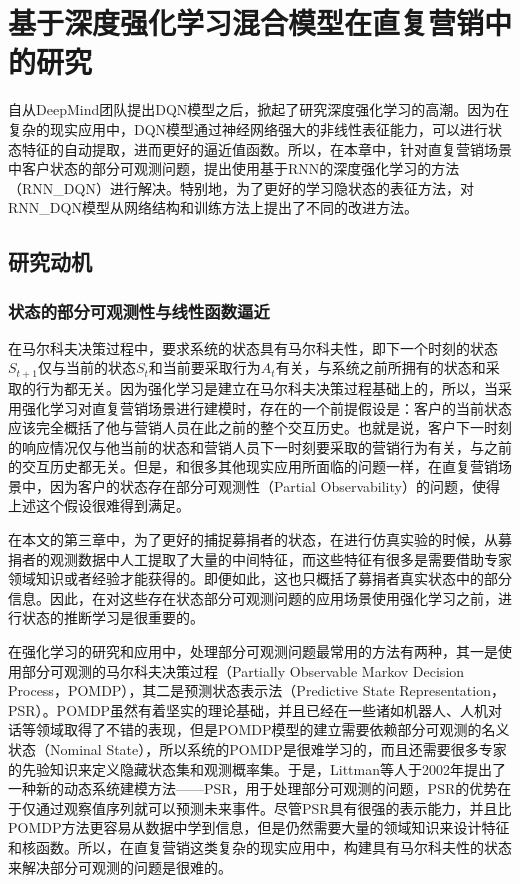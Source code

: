\chapter{基于深度强化学习混合模型在直复营销中的研究}
自从DeepMind团队提出DQN模型之后，掀起了研究深度强化学习的高潮。因为在复杂的现实应用中，DQN模型通过神经网络强大的非线性表征能力，可以进行状态特征的自动提取，进而更好的逼近值函数。所以，在本章中，针对直复营销场景中客户状态的部分可观测问题，提出使用基于RNN的深度强化学习的方法（RNN_DQN）进行解决。特别地，为了更好的学习隐状态的表征方法，对RNN_DQN模型从网络结构和训练方法上提出了不同的改进方法。

\section{研究动机}
\subsection{状态的部分可观测性与线性函数逼近}
在马尔科夫决策过程中，要求系统的状态具有马尔科夫性，即下一个时刻的状态$S_{t+1}$仅与当前的状态$S_{t}$和当前要采取行为$A_{t}$有关，与系统之前所拥有的状态和采取的行为都无关。因为强化学习是建立在马尔科夫决策过程基础上的，所以，当采用强化学习对直复营销场景进行建模时，存在的一个前提假设是：客户的当前状态应该完全概括了他与营销人员在此之前的整个交互历史。也就是说，客户下一时刻的响应情况仅与他当前的状态和营销人员下一时刻要采取的营销行为有关，与之前的交互历史都无关。但是，和很多其他现实应用所面临的问题一样，在直复营销场景中，因为客户的状态存在部分可观测性（Partial Observability）的问题，使得上述这个假设很难得到满足。

在本文的第三章中，为了更好的捕捉募捐者的状态，在进行仿真实验的时候，从募捐者的观测数据中人工提取了大量的中间特征，而这些特征有很多是需要借助专家领域知识或者经验才能获得的。即便如此，这也只概括了募捐者真实状态中的部分信息。因此，在对这些存在状态部分可观测问题的应用场景使用强化学习之前，进行状态的推断学习是很重要的。

在强化学习的研究和应用中，处理部分可观测问题最常用的方法有两种，其一是使用部分可观测的马尔科夫决策过程（Partially Observable Markov  Decision Process，POMDP）\citep{kaelbling1998planning}，其二是预测状态表示法（Predictive State Representation，PSR）\citep{littman2002predictive}。POMDP虽然有着坚实的理论基础，并且已经在一些诸如机器人、人机对话等领域取得了不错的表现\citep{pineau2003point,williams2007partially}，但是POMDP模型的建立需要依赖部分可观测的名义状态（Nominal State），所以系统的POMDP是很难学习的，而且还需要很多专家的先验知识来定义隐藏状态集和观测概率集。于是，Littman等人于2002年提出了一种新的动态系统建模方法——PSR\citep{littman2002predictive}，用于处理部分可观测的问题，PSR的优势在于仅通过观察值序列就可以预测未来事件。尽管PSR具有很强的表示能力，并且比POMDP方法更容易从数据中学到信息，但是仍然需要大量的领域知识来设计特征和核函数。所以，在直复营销这类复杂的现实应用中，构建具有马尔科夫性的状态来解决部分可观测的问题是很难的。

